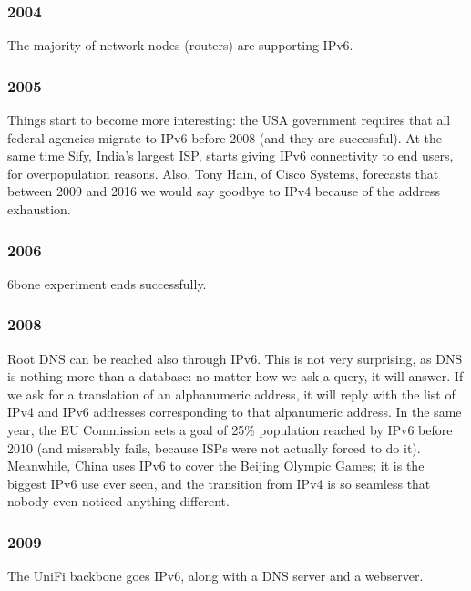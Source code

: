 
\subsubsection*{2004}
The majority of network nodes (routers) are supporting IPv6.


\subsubsection*{2005}
Things start to become more interesting: the USA government requires that all federal agencies migrate to IPv6 before 2008 (and they are successful). At the same time Sify, India's largest ISP, starts giving IPv6 connectivity to end users, for overpopulation reasons. Also, Tony Hain, of Cisco Systems, forecasts that between 2009 and 2016 we would say goodbye to IPv4 because of the address exhaustion.


\subsubsection*{2006}
6bone experiment ends successfully.


\subsubsection*{2008}
Root DNS can be reached also through IPv6. This is not very surprising, as DNS is nothing more than a database: no matter how we ask a query, it will answer. If we ask for a translation of an alphanumeric address, it will reply with the list of IPv4 and IPv6 addresses corresponding to that alpanumeric address. In the same year, the EU Commission sets a goal of 25\% population reached by IPv6 before 2010 (and miserably fails, because ISPs were not actually forced to do it). Meanwhile, China uses IPv6 to cover the Beijing Olympic Games; it is the biggest IPv6 use ever seen, and the transition from IPv4 is so seamless that nobody even noticed anything different.


\subsubsection*{2009}
The UniFi backbone goes IPv6, along with a DNS server and a webserver. %

